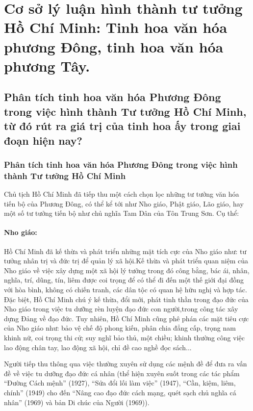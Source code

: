 \section{Cơ sở lý luận hình thành tư tưởng Hồ Chí Minh: Tinh hoa văn hóa phương Đông, tinh hoa văn hóa phương Tây.}

\subsection{Phân tích tinh hoa văn hóa Phương Đông trong việc hình thành Tư tưởng Hồ Chí Minh, từ đó rút ra giá trị của tinh hoa ấy trong giai đoạn hiện nay?}

\subsubsection{Phân tích tinh hoa văn hóa Phương Đông trong việc hình thành Tư tưởng Hồ Chí Minh}
Chủ tịch Hồ Chí Minh đã tiếp thu một cách chọn lọc những tư tưởng văn hóa tiến bộ của Phương Đông, có thể kể tới như Nho giáo, Phật giáo, Lão giáo, hay một số tư tưởng tiến bộ như chủ nghĩa Tam Dân của Tôn Trung Sơn. Cụ thể:

\paragraph{Nho giáo:}
Hồ Chí Minh đã kế thừa và phát triển những mặt tích cực của Nho giáo như: tư tưởng nhân trị và đức trị để quản lý xã hội.Kế thừa và phát triển quan niệm của Nho giáo về việc xây dựng một xã hội lý tưởng trong đó công bằng, bác ái, nhân, nghĩa, trí, dũng, tín, liêm được coi trọng để có thể đi đến một thế giới đại đồng với hòa bình, không có chiến tranh, các dân tộc có quan hệ hữu nghị và hợp tác. Đặc biệt, Hồ Chí Minh chú ý kế thừa, đổi mới, phát tinh thần trong đạo đức của Nho giáo trong việc tu dưỡng rèn luyện đạo đức con người,trong công tác xây dựng Đảng về đạo đức. Tuy nhiên, Hồ Chí Minh cũng phê phán các mặt tiêu cực của Nho giáo như: bảo vệ chế độ phong kiến, phân chia đẳng cấp, trọng nam khinh nữ, coi trọng thi cử; suy nghĩ bảo thủ, một chiều; khinh thường công việc lao động chân tay, lao động xã hội, chỉ đề cao nghề đọc
sách...

Người tiếp thu thông qua việc thường xuyên sử dụng các mệnh đề để đưa ra vấn đề về việc tu dưỡng đạo đức cá nhân (thể hiện xuyên suốt trong các tác phẩm “Đường Cách mệnh” (1927), “Sửa đổi lối làm việc” (1947), “Cần, kiệm, liêm, chính” (1949) cho đến “Nâng cao đạo đức cách mạng, quét sạch chủ nghĩa cá nhân” (1969) và bản Di chúc của Người
(1969)).

